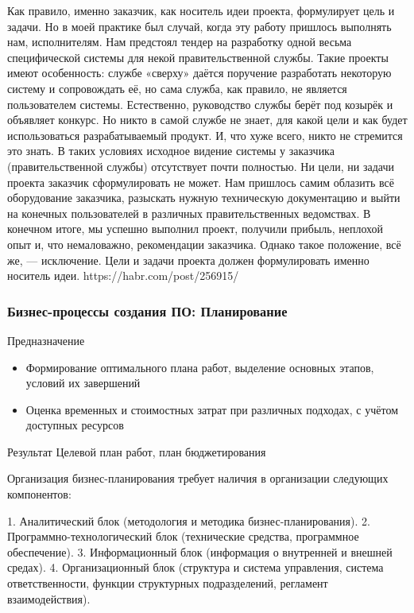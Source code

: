 \documentclass{../industrial-development}
\begin{document}
Как правило, именно заказчик, как носитель идеи проекта, формулирует цель и задачи. Но в моей практике был случай, когда эту работу пришлось выполнять нам, исполнителям. Нам предстоял тендер на разработку одной весьма специфической системы для некой правительственной службы. Такие проекты имеют особенность: службе «сверху» даётся поручение разработать некоторую систему и сопровождать её, но сама служба, как правило, не является пользователем системы. Естественно, руководство службы берёт под козырёк и объявляет конкурс. Но никто в самой службе не знает, для какой цели и как будет использоваться разрабатываемый продукт. И, что хуже всего, никто не стремится это знать. В таких условиях исходное видение системы у заказчика (правительственной службы) отсутствует почти полностью. Ни цели, ни задачи проекта заказчик сформулировать не может. Нам пришлось самим облазить всё оборудование заказчика, разыскать нужную техническую документацию и выйти на конечных пользователей в различных правительственных ведомствах. В конечном итоге, мы успешно выполнил проект, получили прибыль, неплохой опыт и, что немаловажно, рекомендации заказчика. Однако такое положение, всё же, — исключение. Цели и задачи проекта должен формулировать именно носитель идеи.
https://habr.com/post/256915/


\begin{frame} \frametitle{Бизнес-процессы создания ПО: Планирование}
	\begin{block}{Предназначение}
		\begin{itemize}
			\item Формирование оптимального плана работ, выделение основных этапов, условий их завершений
			\item Оценка временных и стоимостных затрат при различных подходах, с учётом доступных ресурсов
		\end{itemize}
	\end{block}
	\begin{block}{Результат}
		Целевой план работ, план бюджетирования
	\end{block}
\end{frame}
\lecturenotes

Организация бизнес-планирования требует наличия в организации следующих компонентов:

1. Аналитический блок (методология и методика бизнес-планирования).
2. Программно-технологический блок (технические средства, программное обеспечение).
3. Информационный блок (информация о внутренней и внешней средах).
4. Организационный блок (структура и система управления, система ответственности, функции структурных подразделений, регламент взаимодействия).
\end{document}
